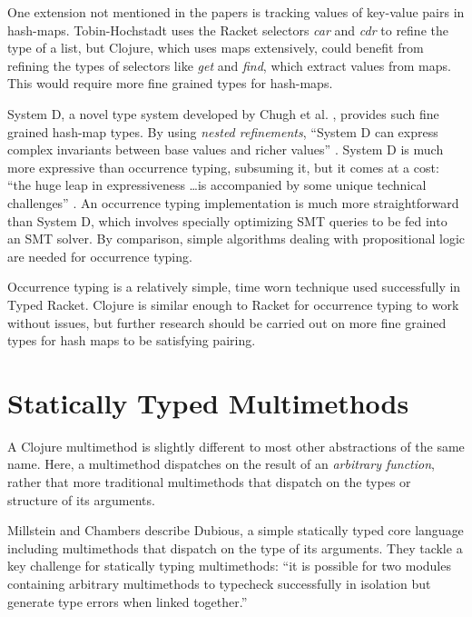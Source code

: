 \documentclass[12pt, a4paper]{article}
\begin{document}
One extension not mentioned in the papers is tracking values of
key-value pairs in hash-maps. Tobin-Hochstadt \cite{Tobin-Hochstadt:2010:LTU:1932681.1863561}
uses the Racket selectors \emph{car} and \emph{cdr} to refine the type of
a list, but Clojure, which uses maps extensively, could benefit from refining the types 
of selectors like \emph{get} and \emph{find}, which extract values from maps.
This would require more fine grained types for hash-maps.

System D, a novel type system developed by Chugh et al. \cite{Chugh:2012:NRL:2103621.2103686}
, provides such fine grained hash-map types. By using \emph{nested refinements},
``System D can express complex invariants between base values and richer values''
\cite{Chugh:2012:NRL:2103621.2103686}
.
System D is much more expressive than occurrence typing, subsuming it, but it comes at a cost:
``the huge leap in expressiveness \ldots is accompanied by some unique technical challenges''
\cite{Chugh:2012:NRL:2103621.2103686}
.
An occurrence typing implementation is much more straightforward than System D, which involves
specially optimizing SMT queries to be fed into an SMT solver. By comparison, simple 
algorithms dealing with propositional logic are needed for occurrence typing.

Occurrence typing is a relatively simple, time worn technique used successfully 
in Typed Racket. Clojure is similar enough to Racket for occurrence typing to work
without issues, but further research should be carried out on more fine grained types
for hash maps to be satisfying pairing.

\section{Statically Typed Multimethods}


A Clojure multimethod is slightly different to most other
abstractions of the same name. Here, a multimethod 
dispatches on the result of an \emph{arbitrary function},
rather that more traditional multimethods that dispatch on
the types or structure of its arguments.

Millstein and Chambers \cite{Millstein02modularstatically}
describe Dubious, a simple statically typed core language including multimethods that
dispatch on the type of its arguments. They tackle a key challenge for statically typing
multimethods: ``it is possible for two modules containing arbitrary multimethods to typecheck
successfully in isolation but generate type errors when linked together.'' \cite{Millstein02modularstatically}
\end{document}
